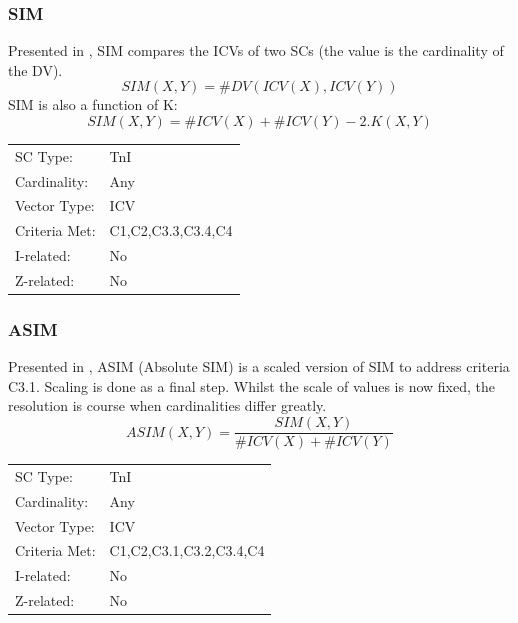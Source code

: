 \documentclass{article}
\begin{document}
\subsubsection{SIM}
\label{sec-11-2-2}

Presented in \citet[pp. 446]{Morris1979}, SIM compares the ICVs of two
SCs (the value is the cardinality of the DV).
$$SIM\left(X,Y\right)=\#DV\left(ICV\left(X\right),ICV\left(Y\right)\right)$$
SIM is also a function of K: $$SIM(X,Y) = \#ICV(X) + \#ICV(Y) -
2.K(X,Y)$$

\begin{center}
\begin{tabular}{ll}
 SC Type:       &  TnI                 \\
 Cardinality:   &  Any                 \\
 Vector Type:   &  ICV                 \\
 Criteria Met:  &  C1,C2,C3.3,C3.4,C4  \\
 I-related:     &  No                  \\
 Z-related:     &  No                  \\
\end{tabular}
\end{center}
\subsubsection{ASIM}
\label{sec-11-2-3}

Presented in \citet[pp. 450]{Morris1979}, ASIM (Absolute SIM) is a
scaled version of SIM to address criteria C3.1. Scaling is done as a
final step. Whilst the scale of values is now fixed, the resolution is
course when cardinalities differ greatly.
$$ASIM\left(X,Y\right)=\frac{SIM\left(X,Y\right)}{\#ICV\left(X\right)+\#ICV\left(Y\right)}$$

\begin{center}
\begin{tabular}{ll}
 SC Type:       &  TnI                      \\
 Cardinality:   &  Any                      \\
 Vector Type:   &  ICV                      \\
 Criteria Met:  &  C1,C2,C3.1,C3.2,C3.4,C4  \\
 I-related:     &  No                       \\
 Z-related:     &  No                       \\
\end{tabular}
\end{center}
\end{document}
